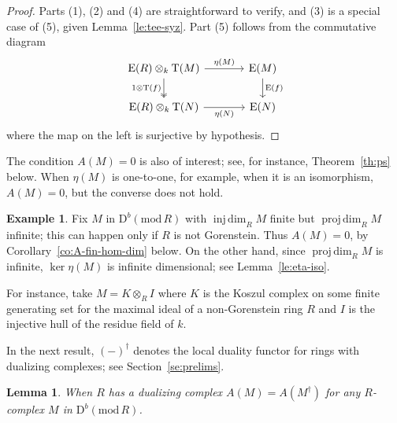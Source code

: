 \documentclass{amsart}
\numberwithin{equation}{section}
\theoremstyle{plain}
\newtheorem{lemma}[equation]{Lemma}
\theoremstyle{definition}
\newtheorem{example}[equation]{Example}
\theoremstyle{remark}
\newcommand{\dbcat}[1]{\mathrm{D}^b(\mathrm{mod}\,{#1})}
\newcommand{\eee}{\operatorname{E}}
\newcommand{\injdim}{\operatorname{inj\,dim}}
\newcommand{\projdim}{\operatorname{proj\,dim}}
\newcommand{\tee}{\operatorname{T}}
\begin{document}
\begin{proof}
Parts (1), (2) and (4) are straightforward to verify, and (3) is a special case of (5), given Lemma~\ref{le:tee-syz}. Part (5) follows from the commutative diagram
        \[
\begin{tikzcd}[column sep=large]
    \eee(R) \otimes_k \tee(M) 
        \arrow[d, twoheadrightarrow, "1\otimes \tee(f)" swap] \arrow[r,"\eta(M)"] 
                & \eee(M) \arrow[d,"\eee(f)"] \\
    \eee(R) \otimes_k  \tee(N) \arrow[r,"\eta(N)"swap]  
                & \eee(N) 
\end{tikzcd}
\]
where the map on the left is surjective by hypothesis.
\end{proof}

The condition $A(M)=0$ is also of interest; see, for instance, Theorem~\ref{th:ps} below. When $\eta(M)$ is one-to-one, for example, when it is an isomorphism, $A(M)=0$, but the converse does not hold.

\begin{example}
\label{ex:A0}
Fix $M$ in $\dbcat R$ with $\injdim_RM$ finite but $\projdim_RM$ infinite; this can happen only if $R$ is not Gorenstein. Thus $A(M)=0$, by Corollary~\ref{co:A-fin-hom-dim} below.  On the other hand, since $\projdim_RM$ is infinite, $\ker \eta(M)$ is infinite dimensional; see Lemma~\ref{le:eta-iso}.

For instance, take  $M=K\otimes_RI$ where $K$ is the Koszul complex on some finite generating set for the maximal ideal of a non-Gorenstein ring $R$ and $I$ is the injective hull of the residue field of $k$. 
\end{example}


In the next result, $(-)^\dagger$ denotes the local duality functor for rings with dualizing complexes; see Section~\ref{se:prelims}.
 
\begin{lemma}
\label{le:A-duality}
When $R$ has a dualizing complex $A(M)=A(M^\dagger)$ for any $R$-complex $M$ in $\dbcat R$.
\end{lemma}
\end{document}
